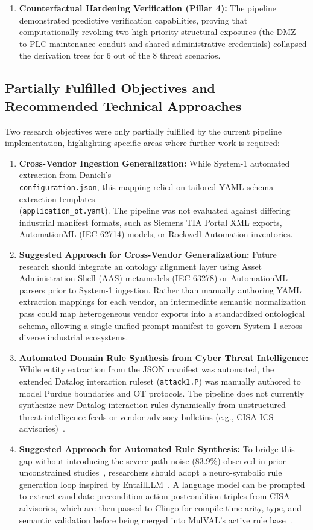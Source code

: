 \documentclass[target=mst,aauheader=aics,style=]{thud}
\begin{document}
\begin{enumerate}
    \item \textbf{Counterfactual Hardening Verification (Pillar 4):} The pipeline demonstrated predictive verification capabilities, proving that computationally revoking two high-priority structural exposures (the DMZ-to-PLC maintenance conduit and shared administrative credentials) collapsed the derivation trees for 6 out of the 8 threat scenarios.
\end{enumerate}

\subsection{Partially Fulfilled Objectives and Recommended Technical Approaches}
Two research objectives were only partially fulfilled by the current pipeline implementation, highlighting specific areas where further work is required:
\begin{enumerate}
    \item \textbf{Cross-Vendor Ingestion Generalization:} While System-1 automated extraction from Danieli's \\ \texttt{configuration.json}, this mapping relied on tailored YAML schema extraction templates \\(\texttt{application\_ot.yaml}). The pipeline was not evaluated against differing industrial manifest formats, such as Siemens TIA Portal XML exports, AutomationML (IEC 62714) models, or Rockwell Automation inventories.
    \item \textbf{Suggested Approach for Cross-Vendor Generalization:} Future research should integrate an ontology alignment layer using Asset Administration Shell (AAS) metamodels (IEC 63278) or AutomationML parsers prior to System-1 ingestion. Rather than manually authoring YAML extraction mappings for each vendor, an intermediate semantic normalization pass could map heterogeneous vendor exports into a standardized ontological schema, allowing a single unified prompt manifest to govern System-1 across diverse industrial ecosystems.
    \item \textbf{Automated Domain Rule Synthesis from Cyber Threat Intelligence:} While entity extraction from the JSON manifest was automated, the extended Datalog interaction ruleset (\texttt{attack1.P}) was manually authored to model Purdue boundaries and OT protocols. The pipeline does not currently synthesize new Datalog interaction rules dynamically from unstructured threat intelligence feeds or vendor advisory bulletins (e.g., CISA ICS advisories)~\cite{mitre_ics, StevanovicWachterRAISE}.
    \item \textbf{Suggested Approach for Automated Rule Synthesis:} To bridge this gap without introducing the severe path noise (83.9\%) observed in prior unconstrained studies~\cite{StevanovicWachterRAISE}, researchers should adopt a neuro-symbolic rule generation loop inspired by EntailLLM~\cite{MukherjiEntailLLM}. A language model can be prompted to extract candidate precondition-action-postcondition triples from CISA advisories, which are then passed to Clingo for compile-time arity, type, and semantic validation before being merged into MulVAL's active rule base~\cite{MukherjiEntailLLM}.
\end{enumerate}
\end{document}
